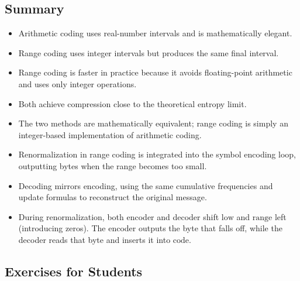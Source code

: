 \documentclass[12pt]{article}
\begin{document}
\subsection{Summary}

\begin{itemize}
    \item Arithmetic coding uses real-number intervals and is mathematically elegant.
    \item Range coding uses integer intervals but produces the same final interval.
    \item Range coding is faster in practice because it avoids floating-point arithmetic and uses only integer operations.
    \item Both achieve compression close to the theoretical entropy limit.
    \item The two methods are mathematically equivalent; range coding is simply an integer-based implementation of arithmetic coding.
    \item Renormalization in range coding is integrated into the symbol encoding loop, outputting bytes when the range becomes too small.
    \item Decoding mirrors encoding, using the same cumulative frequencies and update formulas to reconstruct the original message.
    \item During renormalization, both encoder and decoder shift $\text{low}$ and $\text{range}$ left (introducing zeros). The encoder outputs the byte that falls off, while the decoder reads that byte and inserts it into $\text{code}$.
\end{itemize}

\subsection{Exercises for Students}
\end{document}
